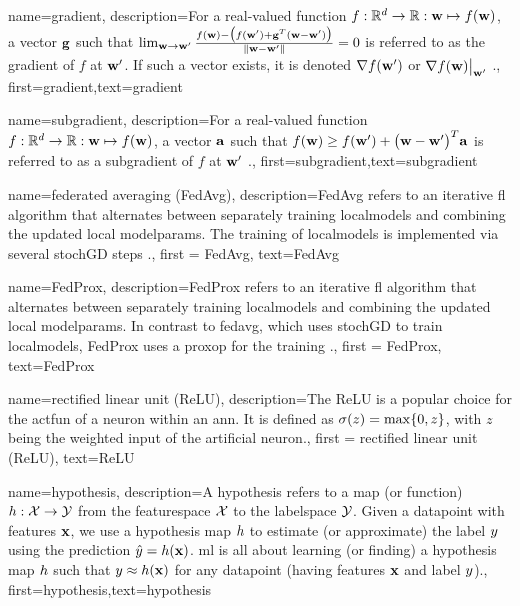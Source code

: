 {{
{name={gradient},
	description={For a real-valued function $f: \mathbb{R}^{d} \rightarrow \mathbb{R}: {\bf w} \mapsto f({\bf w})$, 
	a vector ${\bf g}$ such that $\lim_{{\bf w} \rightarrow {\bf w}'} \frac{f({\bf w}) - \big(f({\bf w}')+ {\bf g}^{T} ({\bf w}- {\bf w}') \big) }{\| {\bf w}-{\bf w}'\|}=0$ 
	is referred to as the gradient of $f$ at ${\bf w}'$. If such a vector exists, it is 
	denoted $\nabla f({\bf w}')$ or $\nabla f({\bf w})\big|_{{\bf w}'}$ \cite{RudinBookPrinciplesMatheAnalysis}.},
	first={gradient},text={gradient} 
}

{name={subgradient},
description={For a real-valued function $f: \mathbb{R}^{d} \rightarrow \mathbb{R}: {\bf w} \mapsto f({\bf w})$, 
		a vector ${\bf a}$ such that $f({\bf w}) \geq  f({\bf w}') +\big({\bf w}-{\bf w}' \big)^{T} {\bf a}$ is 
		referred to as a subgradient of $f$ at ${\bf w}'$ \cite{BertCvxAnalOpt,BertsekasNonLinProgr}.},
	first={subgradient},text={subgradient} 
}

{name={federated averaging (FedAvg)},
	description={FedAvg refers to an iterative \gls{fl} \gls{algorithm} that alternates between separately training \gls{localmodel}s and combining the updated local \gls{modelparams}. The training of \gls{localmodel}s 
		is implemented via several \gls{stochGD} steps \cite{pmlr-v54-mcmahan17a}.}, 
		first = {FedAvg}, text={FedAvg} 
}

{name={FedProx},
	description={FedProx refers to an iterative \gls{fl} \gls{algorithm} that alternates between separately training \gls{localmodel}s and combining the updated local \gls{modelparams}. In contrast to \gls{fedavg}, which uses 
		\gls{stochGD} to train \gls{localmodel}s, FedProx uses a \gls{proxop} for the training \cite{FedProx2020}.}, 
	first = {FedProx}, text={FedProx} 
}

{name={rectified linear unit (ReLU)},
	description={The ReLU is 
		a popular choice for the \gls{actfun} of a neuron within an \gls{ann}. It is defined 
		as $\sigma(z) = \max\{0,z\}$, with $z$ being the weighted input of the artificial 
		neuron.}, first = {rectified linear unit (ReLU)}, text={ReLU} 
}

{name={hypothesis},
	description={A hypothesis refers to a map (or function) $h: \mathcal{X} \rightarrow \mathcal{Y}$ from the 
		\gls{featurespace} $\mathcal{X}$ to the \gls{labelspace} $\mathcal{Y}$. 
		Given a \gls{datapoint} with \gls{feature}s ${\bf x}$, we use a hypothesis map $h$
		to estimate (or approximate) the \gls{label} $y$ using the \gls{prediction}  
		$\hat{y} = h({\bf x})$. \Gls{ml} is all about learning (or finding) a 
		hypothesis map $h$ such that $y \approx h({\bf x})$ 
		for any \gls{datapoint} (having \gls{feature}s ${\bf x}$ and \gls{label} $y$).},
	first={hypothesis},text={hypothesis}  
}



}}

